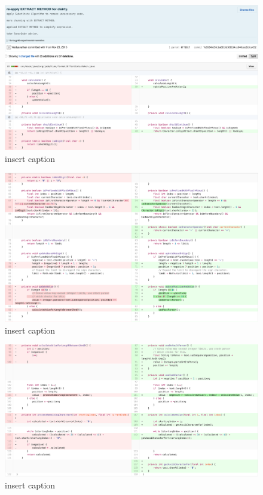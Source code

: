\begin{figure}[H]
	\centering
	\includegraphics[width=\linewidth]{code34}
	\caption{insert caption}
\end{figure}
\begin{figure}[H]
	\centering
	\includegraphics[width=\linewidth]{code35}
	\caption{insert caption}
\end{figure}
\begin{figure}[H]
	\centering
	\includegraphics[width=\linewidth]{code36}
	\caption{insert caption}
\end{figure}

